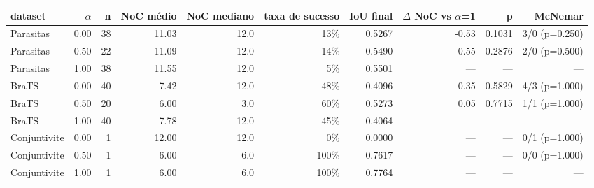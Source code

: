 \begin{adjustbox}{max width=\linewidth}
\begin{tabular}{lrrrrrrrrr}
\toprule
dataset & $\alpha$ & n & NoC médio & NoC mediano & taxa de sucesso & IoU final & $\Delta$ NoC vs $\alpha$=1 & p & McNemar \\
\midrule
Parasitas & 0.00 & 38 & 11.03 & 12.0 & 13\% & 0.5267 & -0.53 & 0.1031 & 3/0 (p=0.250) \\
Parasitas & 0.50 & 22 & 11.09 & 12.0 & 14\% & 0.5490 & -0.55 & 0.2876 & 2/0 (p=0.500) \\
Parasitas & 1.00 & 38 & 11.55 & 12.0 & 5\% & 0.5501 & --- & --- & --- \\
BraTS & 0.00 & 40 & 7.42 & 12.0 & 48\% & 0.4096 & -0.35 & 0.5829 & 4/3 (p=1.000) \\
BraTS & 0.50 & 20 & 6.00 & 3.0 & 60\% & 0.5273 & 0.05 & 0.7715 & 1/1 (p=1.000) \\
BraTS & 1.00 & 40 & 7.78 & 12.0 & 45\% & 0.4064 & --- & --- & --- \\
Conjuntivite & 0.00 & 1 & 12.00 & 12.0 & 0\% & 0.0000 & --- & --- & 0/1 (p=1.000) \\
Conjuntivite & 0.50 & 1 & 6.00 & 6.0 & 100\% & 0.7617 & --- & --- & 0/0 (p=1.000) \\
Conjuntivite & 1.00 & 1 & 6.00 & 6.0 & 100\% & 0.7764 & --- & --- & --- \\
\bottomrule
\end{tabular}
\end{adjustbox}
